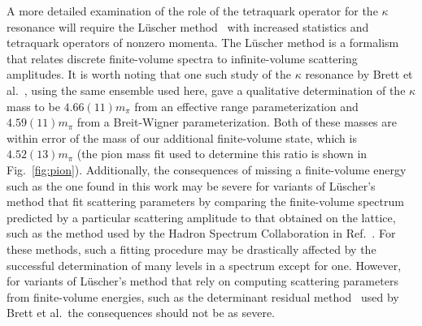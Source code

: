 A more detailed examination of the role of the tetraquark operator for the $\kappa$ resonance will require the L\"uscher method~\cite{Luscher:1990ck} with increased statistics and tetraquark operators of nonzero momenta. The L\"uscher method is a formalism that relates discrete finite-volume spectra to infinite-volume scattering amplitudes. It is worth noting that one such study of the $\kappa$ resonance by Brett et al.~\cite{Brett:2018jqw}, using the same ensemble used here, gave a qualitative determination of the $\kappa$ mass to be $4.66(11)m_\pi$ from an effective range parameterization and $4.59(11)m_\pi$ from  a Breit-Wigner parameterization. Both of these masses are within error of the mass of our additional finite-volume state, which is $4.52(13)m_\pi$ (the pion mass fit used to determine this ratio is shown in Fig.~\ref{fig:pion}). Additionally, the consequences of missing a finite-volume energy such as the one found in this work may be severe for variants of L\"uscher's method that fit scattering parameters by comparing the finite-volume spectrum predicted by a particular scattering amplitude to that obtained on the lattice, such as the method used by the Hadron Spectrum Collaboration in Ref.~\cite{Wilson:2015dqa}. For these methods, such a fitting procedure may be drastically affected by the successful determination of many levels in a spectrum except for one. However, for variants of L\"uscher's method that rely on computing scattering parameters from finite-volume energies, such as the determinant residual method~\cite{Morningstar:2017spu} used by Brett et al.\, the consequences should not be as severe.

